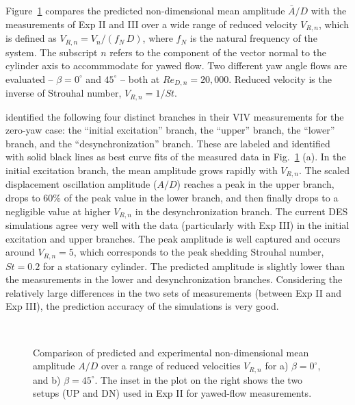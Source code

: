Figure~\ref{fig:VIV_amp} compares the predicted non-dimensional
mean amplitude $\bar{A}/D$ with the measurements of Exp II and III over a wide
range of reduced velocity $V_{R,n}$, which is defined as
$V_{R,n}=V_n/(f_N\,D)$, where $f_N$ is the natural frequency of the system. The
subscript $n$ refers to the component of the vector normal to the cylinder axis
to accommmodate for yawed flow. Two different yaw angle flows are evaluated --
$\beta=0^\circ$ and $45^\circ$ -- both at $Re_{D,n}=20,000$. Reduced velocity
is the inverse of Strouhal number, $V_{R,n} = 1/St$.

\citet{khalak1997fluid} identified the following four distinct branches in
their VIV measurements for the zero-yaw case: the ``initial excitation''
branch, the ``upper'' branch, the ``lower'' branch, and the
``desynchronization'' branch. These are labeled and identified with solid black
lines as best curve fits of the measured data in Fig.~\ref{fig:VIV_amp}
(a). In the initial excitation branch, the mean amplitude grows rapidly with
$V_{R,n}$. The scaled displacement oscillation amplitude ($A/D$) reaches a peak
in the upper branch, drops to 60\% of the peak value in the lower branch, and
then finally drops to a negligible value at higher $V_{R,n}$ in the
desynchronization branch. The current DES simulations agree very well with the
data (particularly with Exp III) in the initial excitation and upper branches.
The peak amplitude is well captured and occurs around $V_{R,n}=5$, which
corresponds to the peak shedding Strouhal number, $St=0.2$ for a stationary
cylinder. The predicted amplitude is slightly lower than the measurements in
the lower and desynchronization branches. Considering the relatively large
differences in the two sets of measurements (between Exp II and Exp III), the
prediction accuracy of the simulations is very good.
%
\begin{figure}[htb!]
  \centering
   {}
  \qquad
   \\
    \caption{Comparison of predicted and experimental non-dimensional mean
      amplitude $A/D$ over a range of reduced velocities $V_{R,n}$ for a)
      $\beta=0^\circ$, and b) $\beta=45^\circ$. The inset in the plot on the right
      shows the two setups (UP and DN) used in Exp II for yawed-flow
      measurements.} 
  \label{fig:VIV_amp}
\end{figure}

